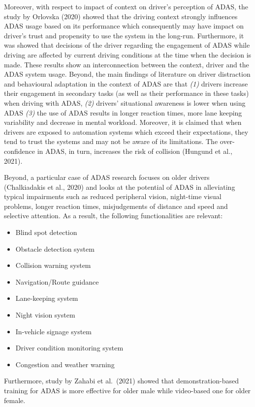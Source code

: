 \documentclass[
]{book}
\providecommand{\tightlist}{%
  \setlength{\itemsep}{0pt}\setlength{\parskip}{0pt}}
\begin{document}
Moreover, with respect to impact of context on driver's perception of ADAS, the study by Orlovska (2020) showed that the driving context strongly influences ADAS usage based on its performance which consequently may have impact on driver's trust and propensity to use the system in the long-run. Furthermore, it was showed that decisions of the driver regarding the engagement of ADAS while driving are affected by current driving conditions at the time when the decision is made. These results show an interconnection between the context, driver and the ADAS system usage. Beyond, the main findings of literature on driver distraction and behavioural adaptation in the context of ADAS are that \emph{(1)} drivers increase their engagement in secondary tasks (as well as their performance in these tasks) when driving with ADAS, \emph{(2)} drivers' situational awareness is lower when using ADAS \emph{(3)} the use of ADAS results in longer reaction times, more lane keeping variability and decrease in mental workload. Moreover, it is claimed that when drivers are exposed to automation systems which exceed their expectations, they tend to trust the systems and may not be aware of its limitations. The over-confidence in ADAS, in turn, increases the risk of collision (Hungund et al., 2021).

Beyond, a particular case of ADAS research focuses on older drivers (Chalkiadakis et al., 2020) and looks at the potential of ADAS in alleviating typical impairments such as reduced peripheral vision, night-time visual problems, longer reaction times, misjudgements of distance and speed and selective attention. As a result, the following functionalities are relevant:

\begin{itemize}
\tightlist
\item
  Blind spot detection
\item
  Obstacle detection system
\item
  Collision warning system
\item
  Navigation/Route guidance
\item
  Lane-keeping system
\item
  Night vision system
\item
  In-vehicle signage system
\item
  Driver condition monitoring system
\item
  Congestion and weather warning
\end{itemize}

Furthermore, study by Zahabi et al.~(2021) showed that demonstration-based training for ADAS is more effective for older male while video-based one for older female.
\end{document}
